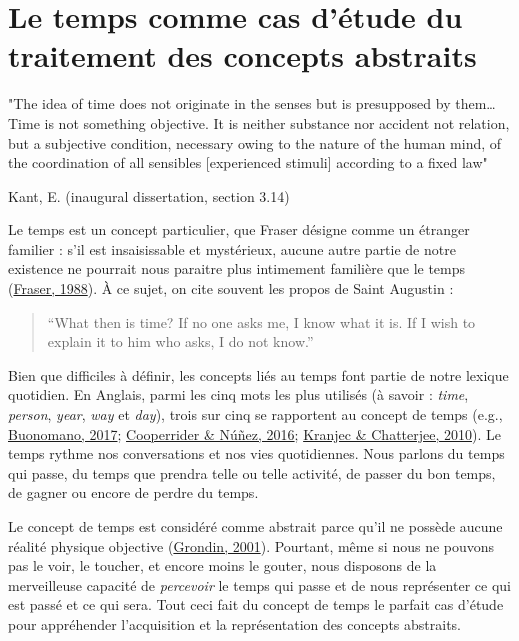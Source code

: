 \documentclass[
  a4paper,12pt,twoside,onecolumn,openright,final,oldfontcommands]{memoir}
\begin{document}
\hypertarget{le-temps-comme-cas-duxe9tude-du-traitement-des-concepts-abstraits}{%
\section{Le temps comme cas d'étude du traitement des concepts abstraits}\label{le-temps-comme-cas-duxe9tude-du-traitement-des-concepts-abstraits}}

\epigraph{"The idea of time does not originate in the senses but is presupposed by them… Time is not something objective. It is neither substance nor accident not relation, but a subjective condition, necessary owing to the nature of the human mind, of the coordination of all sensibles [experienced stimuli] according to a fixed law"}{Kant, E. (inaugural dissertation, section 3.14)}

Le temps est un concept particulier, que Fraser désigne comme un étranger familier : s'il est insaisissable et mystérieux, aucune autre partie de notre existence ne pourrait nous paraitre plus intimement familière que le temps (\protect\hyperlink{ref-fraser_time_1988}{Fraser, 1988}). À ce sujet, on cite souvent les propos de Saint Augustin :

\begin{quote}
``What then is time? If no one asks me, I know what it is. If I wish to explain it to him who asks, I do not know.''
\end{quote}

Bien que difficiles à définir, les concepts liés au temps font partie de notre lexique quotidien. En Anglais, parmi les cinq mots les plus utilisés (à savoir : \emph{time}, \emph{person}, \emph{year}, \emph{way} et \emph{day}), trois sur cinq se rapportent au concept de temps (e.g., \protect\hyperlink{ref-buonomano_your_2017}{Buonomano, 2017}; \protect\hyperlink{ref-cooperrider_how_2016}{Cooperrider \& Núñez, 2016}; \protect\hyperlink{ref-kranjec_are_2010}{Kranjec \& Chatterjee, 2010}). Le temps rythme nos conversations et nos vies quotidiennes. Nous parlons du temps qui passe, du temps que prendra telle ou telle activité, de passer du bon temps, de gagner ou encore de perdre du temps.

Le concept de temps est considéré comme abstrait parce qu'il ne possède aucune réalité physique objective (\protect\hyperlink{ref-grondin_physical_2001}{Grondin, 2001}). Pourtant, même si nous ne pouvons pas le voir, le toucher, et encore moins le gouter, nous disposons de la merveilleuse capacité de \emph{percevoir} le temps qui passe et de nous représenter ce qui est passé et ce qui sera. Tout ceci fait du concept de temps le parfait cas d'étude pour appréhender l'acquisition et la représentation des concepts abstraits.
\end{document}
